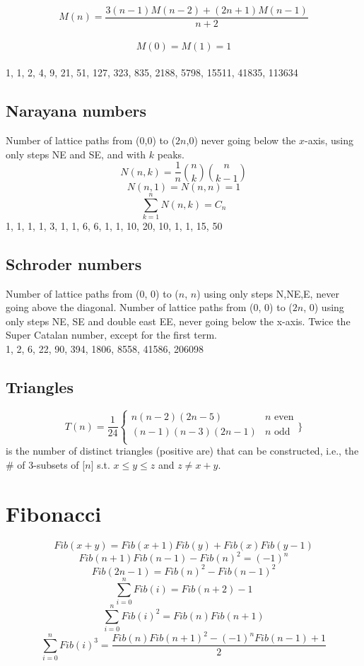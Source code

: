 $$M(n) = \frac{3(n-1)M(n-2)+(2n+1)M(n-1)}{n+2}$$\\
$$M(0) = M(1) = 1$$\\
1, 1, 2, 4, 9, 21, 51, 127, 323, 835, 2188, 5798, 15511, 41835, 113634\newline

\subsection{Narayana numbers}
Number of lattice paths from (0,0) to ($2n$,0) never going below the $x$-axis, using only steps NE and SE, and with $k$ peaks.\\
$$N(n,k) = \frac{1}{n} \binom{n}{k} \binom{n}{k-1}$$
$$N(n,1) = N(n,n) = 1$$
$$\sum_{k=1}^{n} N(n,k) = C_{n}$$
1, 1, 1, 1, 3, 1, 1, 6, 6, 1, 1, 10, 20, 10, 1, 1, 15, 50


\subsection{Schroder numbers}
Number of lattice paths from (0, 0) to ($n$, $n$) using only steps
N,NE,E, never going above the diagonal. Number of lattice
paths from (0, 0) to ($2n$, 0) using only steps NE, SE and
double east EE, never going below the x-axis. Twice the
Super Catalan number, except for the first term.\\
1, 2, 6, 22, 90, 394, 1806, 8558, 41586, 206098\\


\subsection{Triangles}

    \[T(n) = \frac{1}{24}  \left\{
    \begin{array}{ll}
        n(n - 2)(2n - 5) & \text{$n$ even}\\
        (n - 1)(n - 3)(2n - 1) & \text{$n$ odd}\\
    \end{array}
\right.\}\]
is the number of distinct triangles (positive are) that can be constructed, i.e., the \# of 3-subsets of [$n$] s.t. $x \leq y \leq z$ and $z \neq x + y$.\\


\section{Fibonacci}
\newcommand{\Fib}{\mathit{Fib}}
\[\Fib(x + y) = \Fib(x + 1) \Fib(y) + \Fib(x) \Fib(y - 1)\]
\[\Fib(n+1)\Fib(n-1) - \Fib(n)^2 = (-1)^n\]
\[\Fib(2n-1) = \Fib(n)^2 - \Fib(n-1)^2\]
$$ \sum_{i=0}^{n} \Fib(i) = \Fib(n+2) - 1$$
$$ \sum_{i=0}^{n} \Fib(i)^2 = \Fib(n)\Fib(n+1)$$
$$ \sum_{i=0}^{n} \Fib(i)^3 = \frac{\Fib(n)\Fib(n+1)^2 - (-1)^n\Fib(n-1) + 1}{2}$$

